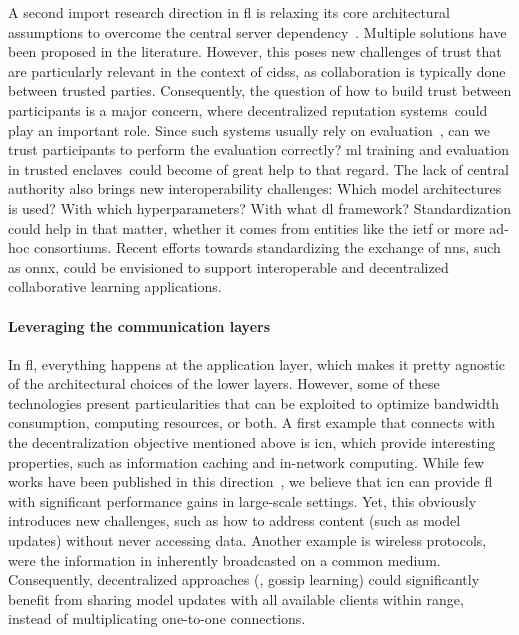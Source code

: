 
A second import research direction in \gls{fl} is relaxing its core architectural assumptions to overcome the central server dependency~\cite{kairouz_AdvancesOpenProblems_2021}.
Multiple solutions have been proposed in the literature.
However, this poses new challenges of trust that are particularly relevant in the context of \glspl{cids}, as collaboration is typically done between trusted parties.
Consequently, the question of how to build trust between participants is a major concern, where decentralized reputation systems~\needref could play an important role.
Since such systems usually rely on evaluation~\needref, can we trust participants to perform the evaluation correctly?
\Gls{ml} training and evaluation in trusted enclaves~\needref could become of great help to that regard.
The lack of central authority also brings new interoperability challenges: Which model architectures is used? With which hyperparameters? With what \gls{dl} framework?
Standardization could help in that matter, whether it comes from entities like the \gls{ietf} or more ad-hoc consortiums.
Recent efforts towards standardizing the exchange of \glspl{nn}, such as \gls{onnx}, could be envisioned to support interoperable and decentralized collaborative learning applications.


\paragraph{Leveraging the communication layers}

In \gls{fl}, everything happens at the application layer, which makes it pretty agnostic of the architectural choices of the lower layers.
However, some of these technologies present particularities that can be exploited to optimize bandwidth consumption, computing resources, or both.
A first example that connects with the decentralization objective mentioned above is \gls{icn}, which provide interesting properties, such as information caching and in-network computing.
While few works have been published in this direction~\needref, we believe that \gls{icn} can provide \gls{fl} with significant performance gains in large-scale settings.
Yet, this obviously introduces new challenges, such as how to address content (such as model updates) without never accessing data.
Another example is wireless protocols, were the information in inherently broadcasted on a common medium.
Consequently, decentralized approaches (\eg, gossip learning) could significantly benefit from sharing model updates with all available clients within range, instead of multiplicating one-to-one connections.


